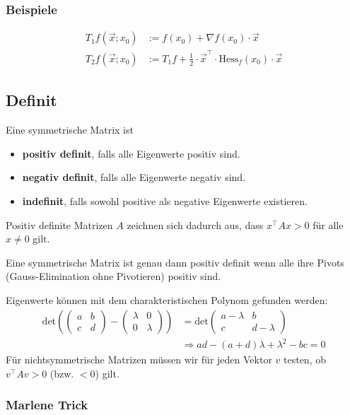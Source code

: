 \documentclass[a4paper,10pt]{article}
\begin{document}
\subsubsection*{Beispiele}
\begin{align*}
  T_1 f(\vec{x}; x_0) &:= f(x_0) + \nabla f(x_0) \cdot \vec{x} \\
  T_2 f(\vec{x}; x_0) &:= T_1f + \frac{1}{2} \cdot \vec{x}^\top \cdot \text{Hess}_f(x_0) \cdot \vec{x}
\end{align*}

\subsection{Definit}
Eine symmetrische Matrix ist
\begin{itemize}
  \item \textbf{positiv definit}, falls alle Eigenwerte positiv sind.
  \item \textbf{negativ definit}, falls alle Eigenwerte negativ sind.
  \item \textbf{indefinit}, falls sowohl positive als negative Eigenwerte existieren.
\end{itemize}

Positiv definite Matrizen $A$ zeichnen sich dadurch aus, dass $x^\top A x > 0$ für alle $x \neq 0$ gilt.

Eine symmetrische Matrix ist genau dann positiv definit wenn alle ihre Pivots (Gauss-Elimination ohne Pivotieren) positiv sind.

Eigenwerte können mit dem charakteristischen Polynom gefunden werden:
\begin{align*}
  \text{det} \left(
  \begin{pmatrix}
    a & b\\
    c & d
  \end{pmatrix}
  -
  \begin{pmatrix}
    \lambda & 0\\
    0 & \lambda
  \end{pmatrix}
  \right)
  &=
  \text{det}
  \begin{pmatrix}
    a - \lambda & b\\
    c & d - \lambda
  \end{pmatrix}\\
  &\Rightarrow ad - (a + d) \lambda + \lambda^2 - bc = 0
\end{align*}
Für nichtsymmetrische Matrizen müssen wir für jeden Vektor \(v\) testen, ob \(v^\top A v > 0\) (bzw. \(< 0\)) gilt.
\subsubsection*{Marlene Trick}
\end{document}
